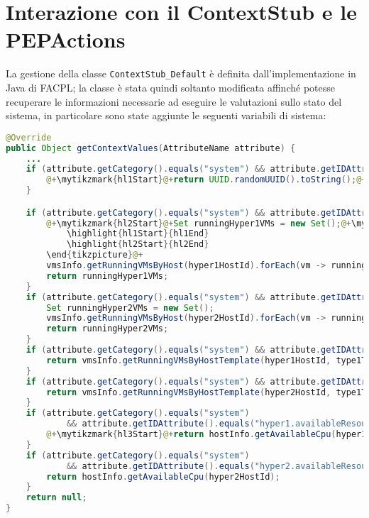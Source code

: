 \section{Interazione con il ContextStub e le PEPActions}
La gestione della classe \texttt{ContextStub\_Default} è definita dall'implementazione in Java di FACPL; la classe è stata quindi soltanto modificata affinché potesse recuperare le informazioni necessarie ad eseguire le valutazioni sullo stato del sistema, in particolare sono state aggiunte le seguenti variabili di sistema:
\begin{lstlisting}[language=Java, caption=Context di OpenNebula, label=code:ContextStubChoice, basicstyle=\fontsize{9}{10}\ttfamily]
@Override
public Object getContextValues(AttributeName attribute) {
    ...
    if (attribute.getCategory().equals("system") && attribute.getIDAttribute().equals("vm-name")) {
        @+\mytikzmark{hl1Start}@+return UUID.randomUUID().toString();@+\mytikzmark{hl1End}@+
    }

    if (attribute.getCategory().equals("system") && attribute.getIDAttribute().equals("hyper1.vm-names")) {
        @+\mytikzmark{hl2Start}@+Set runningHyper1VMs = new Set();@+\mytikzmark{hl2End}@+@+\begin{tikzpicture}[remember picture, overlay]
            \highlight{hl1Start}{hl1End}
            \highlight{hl2Start}{hl2End}
        \end{tikzpicture}@+
        vmsInfo.getRunningVMsByHost(hyper1HostId).forEach(vm -> runningHyper1VMs.addValue(vm.getVmName()));
        return runningHyper1VMs;
    }
    if (attribute.getCategory().equals("system") && attribute.getIDAttribute().equals("hyper2.vm-names")) {
        Set runningHyper2VMs = new Set();
        vmsInfo.getRunningVMsByHost(hyper2HostId).forEach(vm -> runningHyper2VMs.addValue(vm.getVmName()));
        return runningHyper2VMs;
    }
    if (attribute.getCategory().equals("system") && attribute.getIDAttribute().equals("hyper1.vm1-counter")) {
        return vmsInfo.getRunningVMsByHostTemplate(hyper1HostId, type1Template).size();
    }
    if (attribute.getCategory().equals("system") && attribute.getIDAttribute().equals("hyper2.vm1-counter")) {
        return vmsInfo.getRunningVMsByHostTemplate(hyper2HostId, type1Template).size();
    }
    if (attribute.getCategory().equals("system")
            && attribute.getIDAttribute().equals("hyper1.availableResources")) {
        @+\mytikzmark{hl3Start}@+return hostInfo.getAvailableCpu(hyper1HostId);@+\mytikzmark{hl3End}@+
    }
    if (attribute.getCategory().equals("system")
            && attribute.getIDAttribute().equals("hyper2.availableResources")) {
        return hostInfo.getAvailableCpu(hyper2HostId);
    }
    return null;
}
\end{lstlisting}
